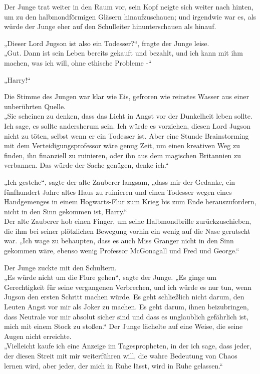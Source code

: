 {Der Junge trat weiter in den Raum vor, sein Kopf neigte sich weiter nach hinten, um zu den halbmondförmigen Gläsern hinaufzuschauen; und irgendwie war es, als würde der Junge eher auf den Schulleiter hinunterschauen als hinauf.

„Dieser Lord Jugson ist also ein Todesser?“, fragte der Junge leise.\\ „Gut. Dann ist sein Leben bereits gekauft und bezahlt, und ich kann mit ihm machen, was ich will, ohne ethische Probleme -“

„Harry!“

Die Stimme des Jungen war klar wie Eis, gefroren wie reinstes Wasser aus einer unberührten Quelle.\\ „Sie scheinen zu denken, dass das Licht in Angst vor der Dunkelheit leben sollte. Ich sage, es sollte andersherum sein. Ich würde es vorziehen, diesen Lord Jugson nicht zu töten, selbst wenn er ein Todesser ist. Aber eine Stunde Brainstorming mit dem Verteidigungsprofessor wäre genug Zeit, um einen kreativen Weg zu finden, ihn finanziell zu ruinieren, oder ihn aus dem magischen Britannien zu verbannen. Das würde der Sache genügen, denke ich.“

„Ich gestehe“, sagte der alte Zauberer langsam, „dass mir der Gedanke, ein fünfhundert Jahre altes Haus zu ruinieren und einen Todesser wegen eines Handgemenges in einem Hogwarts-Flur zum Krieg bis zum Ende herauszufordern, nicht in den Sinn gekommen ist, Harry.“\\ Der alte Zauberer hob einen Finger, um seine Halbmondbrille zurückzuschieben, die ihm bei seiner plötzlichen Bewegung vorhin ein wenig auf die Nase gerutscht war. „Ich wage zu behaupten, dass es auch Miss Granger nicht in den Sinn gekommen wäre, ebenso wenig Professor McGonagall und Fred und George.“

Der Junge zuckte mit den Schultern.\\ „Es würde nicht um die Flure gehen“, sagte der Junge. „Es ginge um Gerechtigkeit für seine vergangenen Verbrechen, und ich würde es nur tun, wenn Jugson den ersten Schritt machen würde. Es geht schließlich nicht darum, den Leuten Angst vor mir als Joker zu machen. Es geht darum, ihnen beizubringen, dass Neutrale vor mir absolut sicher sind und dass es unglaublich gefährlich ist, mich mit einem Stock zu stoßen.“ Der Junge lächelte auf eine Weise, die seine Augen nicht erreichte.\\ „Vielleicht kaufe ich eine Anzeige im Tagespropheten, in der ich sage, dass jeder, der diesen Streit mit mir weiterführen will, die wahre Bedeutung von Chaos lernen wird, aber jeder, der mich in Ruhe lässt, wird in Ruhe gelassen.“

}
